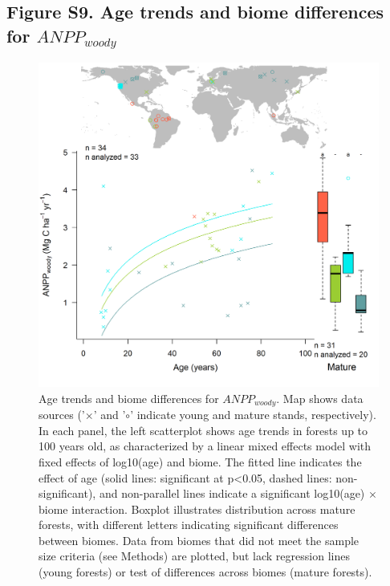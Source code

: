\documentclass[
]{article}
\begin{document}
\newpage

\hypertarget{figure-s9.-age-trends-and-biome-differences-for-anpp_woody}{%
\subsection{\texorpdfstring{Figure S9. Age trends and biome differences
for
\(ANPP_{woody}\)}{Figure S9. Age trends and biome differences for ANPP\_\{woody\}}}\label{figure-s9.-age-trends-and-biome-differences-for-anpp_woody}}

\begin{figure}[H]

{\centering \includegraphics[width=1\linewidth]{tables_figures/age_trends/ANPP_woody_with_map} 

}

\caption{Age trends and biome differences for $ANPP_{woody}$. Map shows data sources ('$\times$' and '$\circ$' indicate young and mature stands, respectively). In each panel, the left scatterplot shows age trends in forests up to 100 years old, as characterized by a linear mixed effects model with fixed effects of log10(age) and biome. The fitted line indicates the effect of age (solid lines: significant at p<0.05, dashed lines: non-significant), and non-parallel lines indicate a significant log10(age) $\times$ biome interaction. Boxplot illustrates distribution across mature forests, with different letters indicating significant differences between biomes. Data from biomes that did not meet the sample size criteria (see Methods) are plotted, but lack regression lines (young forests) or test of differences across biomes (mature forests).}\label{fig:unnamed-chunk-12}
\end{figure}
\end{document}
